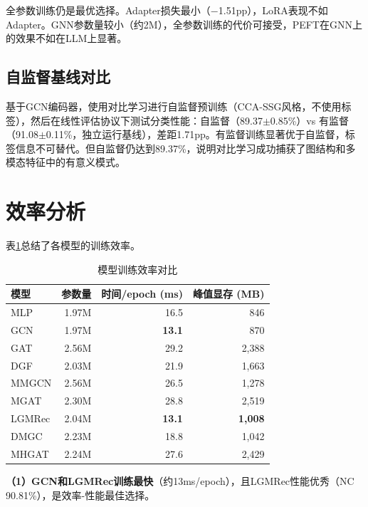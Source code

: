 全参数训练仍是最优选择。Adapter损失最小（$-$1.51pp），LoRA表现不如Adapter。GNN参数量较小（约2M），全参数训练的代价可接受，PEFT在GNN上的效果不如在LLM上显著。

\subsection{自监督基线对比}

基于GCN编码器，使用对比学习进行自监督预训练（CCA-SSG风格，不使用标签），然后在线性评估协议下测试分类性能：自监督（89.37$\pm$0.85\%）vs 有监督（91.08$\pm$0.11\%，独立运行基线），差距1.71pp。有监督训练显著优于自监督，标签信息不可替代。但自监督仍达到89.37\%，说明对比学习成功捕获了图结构和多模态特征中的有意义模式。

\section{效率分析}

表\ref{tab:efficiency}总结了各模型的训练效率。

\begin{table}[htbp]
  \centering
  \caption{模型训练效率对比\protect\footnotemark}
  \label{tab:efficiency}
  \begin{tabular}{lrrr}
    \toprule
    模型 & 参数量 & 时间/epoch (ms) & 峰值显存 (MB) \\
    \midrule
    MLP & 1.97M & 16.5 & 846 \\
    GCN & 1.97M & \textbf{13.1} & 870 \\
    GAT & 2.56M & 29.2 & 2,388 \\
    DGF & 2.03M & 21.9 & 1,663 \\
    MMGCN & 2.56M & 26.5 & 1,278 \\
    MGAT & 2.30M & 28.8 & 2,519 \\
    LGMRec & 2.04M & \textbf{13.1} & \textbf{1,008} \\
    DMGC & 2.23M & 18.8 & 1,042 \\
    MHGAT & 2.24M & 27.6 & 2,429 \\
    \bottomrule
  \end{tabular}
\end{table}


\textbf{（1）GCN和LGMRec训练最快}（约13ms/epoch），且LGMRec性能优秀（NC 90.81\%），是效率-性能最佳选择。

